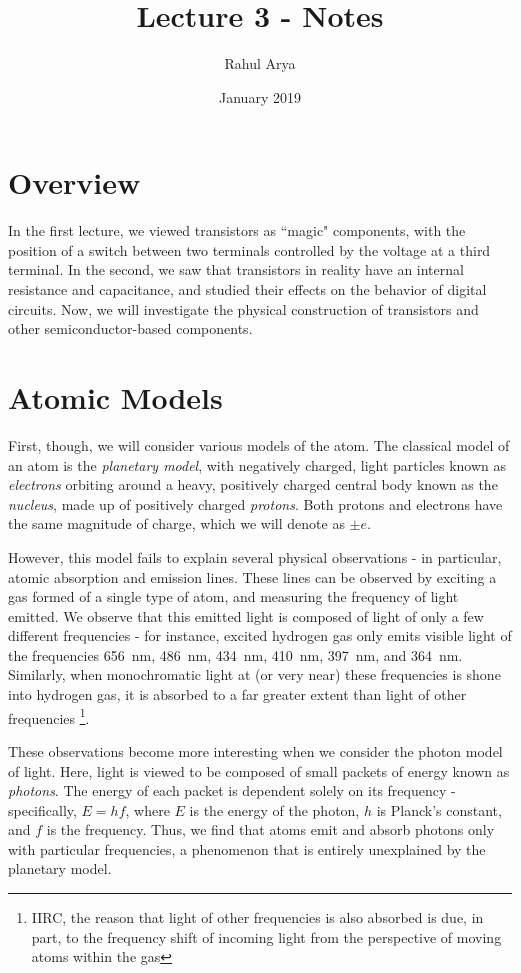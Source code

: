\documentclass[letterpaper]{article}
\title{Lecture 3 - Notes}
\author{Rahul Arya}
\date{January 2019}
\theoremstyle{remark}
\begin{document}
\maketitle

\section{Overview}
In the first lecture, we viewed transistors as ``magic" components, with the position of a switch between two terminals controlled by the voltage at a third terminal. In the second, we saw that transistors in reality have an internal resistance and capacitance, and studied their effects on the behavior of digital circuits. Now, we will investigate the physical construction of transistors and other semiconductor-based components.

\section{Atomic Models}
First, though, we will consider various models of the atom. The classical model of an atom is the \emph{planetary model}, with negatively charged, light particles known as \emph{electrons} orbiting around a heavy, positively charged central body known as the \emph{nucleus}, made up of positively charged \emph{protons}. Both protons and electrons have the same magnitude of charge, which we will denote as $\pm e$.

However, this model fails to explain several physical observations - in particular, atomic absorption and emission lines. These lines can be observed by exciting a gas formed of a single type of atom, and measuring the frequency of light emitted. We observe that this emitted light is composed of light of only a few different frequencies - for instance, excited hydrogen gas only emits visible light of the frequencies \SI{656}{\nano\meter}, \SI{486}{\nano\meter}, \SI{434}{\nano\meter},  \SI{410}{\nano\meter}, \SI{397}{\nano\meter}, and \SI{364}{\nano\meter}. Similarly, when monochromatic light at (or very near) these frequencies is shone into hydrogen gas, it is absorbed to a far greater extent than light of other frequencies \footnote{IIRC, the reason that light of other frequencies is also absorbed is due, in part, to the frequency shift of incoming light from the perspective of moving atoms within the gas}.

These observations become more interesting when we consider the photon model of light. Here, light is viewed to be composed of small packets of energy known as \emph{photons}. The energy of each packet is dependent solely on its frequency - specifically, $E = hf$, where $E$ is the energy of the photon, $h$ is Planck's constant, and $f$ is the frequency. Thus, we find that atoms emit and absorb photons only with particular frequencies, a phenomenon that is entirely unexplained by the planetary model.
\end{document}
